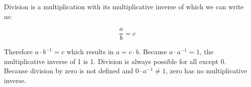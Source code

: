 \documentclass[../main.tex]{subfiles}
\begin{document}
    \begin{table}[htp]
        \begin{center}
            \quad
        \end{center}
    \end{table}

    Division is a multiplication with its multiplicative inverse of which we can write as:

    \begin{equation*}
        \dfrac{a}{b}=c
    \end{equation*}

    \noindent
    Therefore $a \cdot b^{-1} = c$ which results in $a = c \cdot b$. Because $a \cdot a ^{-1} = 1$, the multiplicative inverse of 1 is 1. Division is always possible for all except 0. Because division by zero is not defined and $0 \cdot a^{-1} \neq 1$, zero has no multiplicative inverse.
\end{document}
